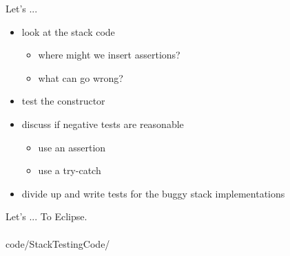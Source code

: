 \documentclass{beamer}
\begin{document}
\begin{frame}[fragile]{ Let's ...}
\begin{itemize}
\item look at the stack code
  \begin{itemize}
  \item where might we insert assertions?
  \item what can go wrong?
  \end{itemize}
\item test the constructor
\item discuss if negative tests are reasonable
  \begin{itemize}
  \item use an assertion
  \item use a try-catch
  \end{itemize}
\item divide up and write tests for the buggy stack implementations
\end{itemize}
\end{frame}


\begin{frame}[fragile]{ Let's ...}
To Eclipse.\\ \ \\

code/StackTestingCode/
\end{frame}
\end{document}
